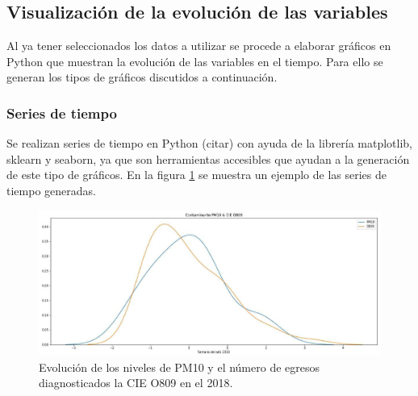 \subsection{Visualización de la evolución de las variables}
Al ya tener seleccionados los datos a utilizar se procede a elaborar gráficos en Python que muestran la evolución de las variables en el tiempo. Para ello se generan los tipos de gráficos discutidos a continuación.

\subsubsection{Series de tiempo}
Se realizan series de tiempo en Python (citar) con ayuda de la librería matplotlib, sklearn y seaborn, ya que son herramientas accesibles que ayudan a la generación de este tipo de gráficos. 
En la figura \ref{serie_de_tiempo} se muestra un ejemplo de las series de tiempo generadas.
\begin{figure}[h!]
\setcounter{figure}{0} %
\captionsetup{type=figure} %
\begin{center}
   \includegraphics[width=1\textwidth]{PM10_O809_2018.eps}
   \end{center}
    \caption{Evolución de los niveles de PM10 y el número de egresos diagnosticados la CIE O809 en el 2018.}
    \label{serie_de_tiempo}
\end{figure}

